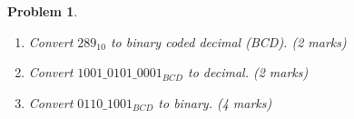 \documentclass{article}
\newtheorem{prob}{Problem}
\begin{document}
\begin{prob}
  \begin{enumerate}
  \item Convert $289_{10}$  to binary coded decimal (BCD). (2 marks)
  \item Convert $1001\_ 0101\_ 0001_{BCD}$  to decimal. (2 marks)
  \item Convert $0110\_ 1001_{BCD}$  to binary. (4 marks)
  \end{enumerate}
\end{prob}
\end{document}
